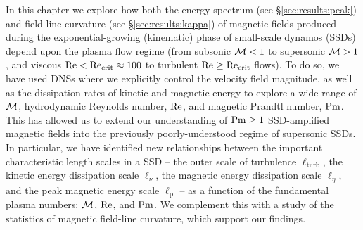 In this chapter we explore how both the energy spectrum (see \S\ref{sec:results:peak}) and field-line curvature (see \S\ref{sec:results:kappa}) of magnetic fields produced during the exponential-growing (kinematic) phase of small-scale dynamos (SSDs) depend upon the plasma flow regime (from subsonic $\mathcal{M} < 1$ to supersonic $\mathcal{M} > 1$, and viscous $\mathrm{Re} < \mathrm{Re}_\mathrm{crit} \approx 100$ to turbulent $\mathrm{Re} \geq \mathrm{Re}_\mathrm{crit}$ flows). To do so, we have used DNSs where we explicitly control the velocity field magnitude, as well as the dissipation rates of kinetic and magnetic energy to explore a wide range of $\mathcal{M}$, hydrodynamic Reynolds number, $\mathrm{Re}$, and magnetic Prandtl number, $\mathrm{Pm}$. This has allowed us to extend our understanding of $\mathrm{Pm} \geq 1$ SSD-amplified magnetic fields into the previously poorly-understood regime of supersonic SSDs. In particular, we have identified new relationships between the important characteristic length scales in a SSD -- the outer scale of turbulence $\ell_\mathrm{turb}$, the kinetic energy dissipation scale $\ell_\nu$, the magnetic energy dissipation scale $\ell_\eta$, and the peak magnetic energy scale $\ell_\mathrm{p}$ -- as a function of the fundamental plasma numbers: $\mathcal{M}$, $\mathrm{Re}$, and $\mathrm{Pm}$. We complement this with a study of the statistics of magnetic field-line curvature, which support our findings.


